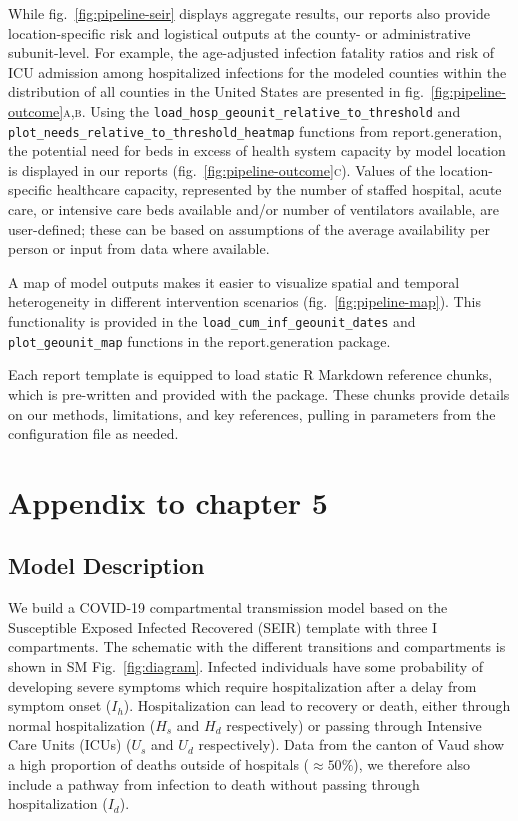 While fig.~\ref{fig:pipeline-seir} displays aggregate results, our reports also provide location-specific risk and logistical outputs at the county- or administrative subunit-level. For example, the age-adjusted infection fatality ratios and risk of ICU admission among hospitalized infections for the modeled counties within the distribution of all counties in the United States are presented in fig.~\ref{fig:pipeline-outcome}\textsc{a,b}. Using the \verb|load_hosp_geounit_relative_to_threshold| and \verb|plot_needs_relative_to_threshold_heatmap| functions from report.generation, the potential need for beds in excess of health system capacity by model location is displayed in our reports (fig.~\ref{fig:pipeline-outcome}\textsc{c}). Values of the location-specific healthcare capacity, represented by the number of staffed hospital, acute care, or intensive care beds available and/or number of ventilators available, are user-defined; these can be based on assumptions of the average availability per person or input from data where available.

A map of model outputs makes it easier to visualize spatial and temporal heterogeneity in different intervention scenarios (fig.~\ref{fig:pipeline-map}). This functionality is provided in the \verb|load_cum_inf_geounit_dates| and \verb|plot_geounit_map| functions in the report.generation package.

Each report template is equipped to load static R Markdown reference chunks, which is pre-written and provided with the package. These chunks provide details on our methods, limitations, and key references, pulling in parameters from the configuration file as needed.


\chapter{Appendix to chapter 5}

\section{Model Description}
We build a COVID-19 compartmental transmission model based on the Susceptible Exposed Infected Recovered (SEIR) template with three I compartments. The schematic with the different transitions and compartments is shown in SM Fig.~\ref{fig:diagram}. Infected individuals have some probability of developing severe symptoms which require hospitalization after a delay from symptom onset ($I_h$). Hospitalization can lead to recovery or death, either through normal hospitalization ($H_{s}$ and $H_d$ respectively) or passing through Intensive Care Units (ICUs) ($U_{s}$ and $U_d$ respectively). Data from the canton of Vaud show a high proportion of deaths outside of hospitals ($\approx 50\%$), we therefore also include a pathway from infection to death without passing through hospitalization ($I_d$). 


